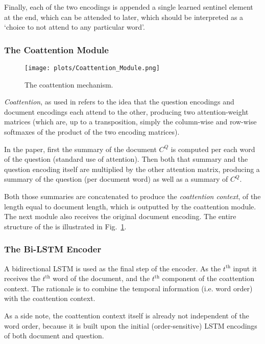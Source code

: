 \documentclass[a4paper, 10pt, conference]{article}
\begin{document}

Finally, each of the two encodings is appended a single learned sentinel element at the end, which can be attended to later, which should be interpreted as a `choice to not attend to any particular word'.

\subsubsection{The Coattention Module}

\begin{figure}\label{fig:coattention}
\centering
\texttt{[image: plots/Coattention\_Module.png]}
\caption{The coattention mechanism.}
\end{figure}

\textit{Coattention}, as used in \cite{dcn} refers to the idea that the question encodings and document encodings each attend to the other, producing two attention-weight matrices (which are, up to a transposition, simply the column-wise and row-wise softmaxes of the product of the two encoding matrices).

In the paper, first the summary of the document $C^Q$ is computed per each word of the question (standard use of attention). Then both that summary and the question encoding itself are multiplied by the other attention matrix, producing a summary of the question (per document word) as well as a summary of $C^Q$.

Both those summaries are concatenated to produce the \textit{coattention context}, of the length equal to document length, which is outputted by the coattention module. The next module also receives the original document encoding. The entire structure of the  is illustrated in Fig.~\ref{fig:coattention}.


\subsubsection{The Bi-LSTM Encoder}

A bidirectional LSTM is used as the final step of the encoder. As the $t^\text{th}$ input it receives the $t^\text{th}$ word of the document, and the $t^\text{th}$ component of the coattention context. The rationale is to combine the temporal information (i.e. word order) with the coattention context.

As a side note, the coattention context itself is already not independent of the word order, because it is built upon the initial (order-sensitive) LSTM encodings of both document and question.
\end{document}
